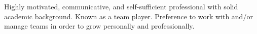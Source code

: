 

\begin{cvsummary}
\vspace{0.5cm}
Highly motivated, communicative, and self-sufficient professional with solid academic background.
Known as a team player. Preference to work with and/or manage teams in order to grow personally and professionally.
\end{cvsummary}
